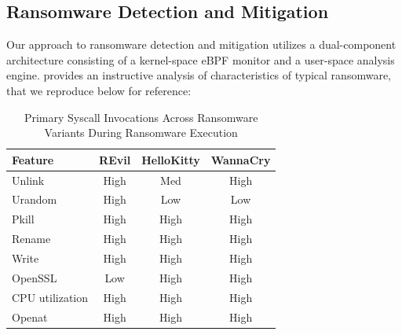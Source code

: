 \documentclass[twocolumn, 10pt]{scrartcl}
\begin{document}
\subsection{Ransomware Detection and Mitigation}
Our approach to ransomware detection and mitigation utilizes a dual-component architecture consisting of a kernel-space eBPF monitor and a user-space analysis engine. \cite{sekar2024} provides an instructive analysis of characteristics of typical ransomware, that we reproduce below for reference:
\begin{table}[htbp]
\centering
\begin{tabular}{lccc}
\toprule
\textbf{Feature} & \textbf{REvil} & \textbf{HelloKitty} & \textbf{WannaCry} \\
\midrule
Unlink   & High & Med  & High \\
Urandom  & High & Low  & Low  \\
Pkill    & High & High & High \\
Rename   & High & High & High \\
Write    & High & High & High \\
OpenSSL  & Low  & High & High \\
CPU utilization     & High & High & High \\
Openat   & High & High & High \\
\bottomrule
\end{tabular}
\caption{Primary Syscall Invocations Across Ransomware Variants During Ransomware Execution \cite{sekar2024}}
\label{tab:ransomchar}
\end{table}
\end{document}
